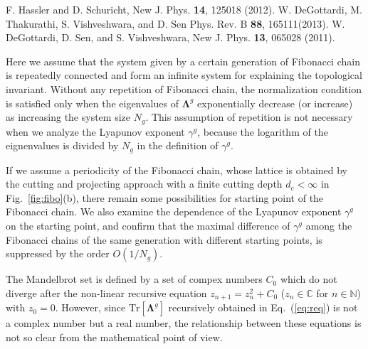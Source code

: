 \documentclass[%
superscriptaddress,
preprint,
amsmath,amssymb,
]{revtex4-1}
\newcommand{\mrm}{\mathrm}
\newcommand{\mbf}{\mathbf}
\newcommand{\mbb}{\mathbb}
\begin{document}
\begin{thebibliography}{00}
 F. Hassler and D. Schuricht, New J. Phys. {\bf 14}, 125018 (2012).
  W.  DeGottardi, M. Thakurathi, S. Vishveshwara, and D. Sen Phys. Rev. B {\bf 88}, 165111(2013).
 W. DeGottardi, D. Sen, and S. Vishveshwara, New J. Phys. {\bf 13}, 065028 (2011).

 Here we assume that the system given by a certain generation of Fibonacci chain is repeatedly connected and form an infinite system for explaining the topological invariant. Without any repetition of Fibonacci chain, the normalization condition is satisfied only when the eigenvalues of $\mbf{\Lambda}^g$ exponentially decrease (or increase) as increasing the system size $N_g$. This assumption of repetition is not necessary when we analyze the Lyapunov exponent $\gamma^g$, because the logarithm of the eignenvalues is divided by $N_g$ in the definition of $\gamma^g$.

 If we assume a periodicity of the Fibonacci chain, whose lattice is obtained by the cutting and projecting approach with a finite cutting depth $d_c<\infty$ in Fig.~\ref{fig:fibo}(b), there remain some possibilities for starting point of the Fibonacci chain.
We also examine the dependence of the Lyapunov exponent $\gamma^g$ on the starting point, and confirm that the maximal difference of $\gamma^g$ among the Fibonacci chains of the same generation with different starting points, is suppressed by the order $O(1/N_g)$.

 The Mandelbrot set is defined by a set of compex numbers $C_0$ which do not diverge after the non-linear recursive equation $z_{n+1}=z_n^2+C_0$ ($z_n\in\mbb{C}$ for $n\in\mbb{N}$) with $z_0=0$. However, since $\mrm{Tr}[\mbf{\Lambda}^g]$ recursively obtained in Eq.~(\ref{eq:req}) is not a complex number but a real number, the relationship between these equations is not so clear from the mathematical point of view.
\end{thebibliography}
\end{document}
